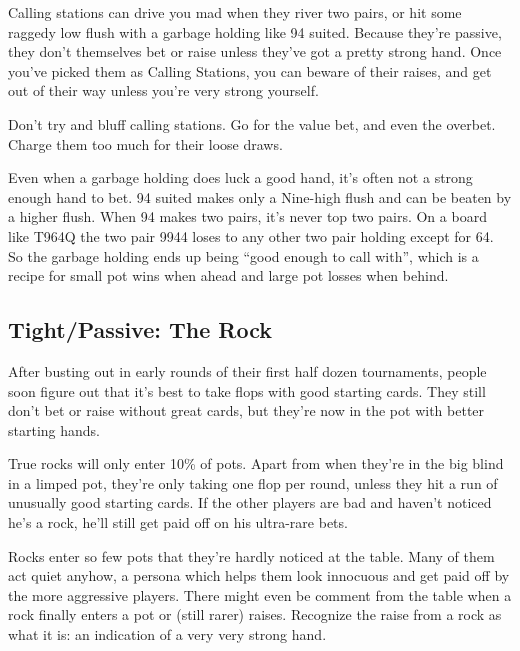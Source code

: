 Calling stations can drive you mad when they river two pairs, 
or hit some raggedy low flush with a garbage holding like 94 suited.
Because they're passive, they don't themselves bet or raise unless
they've got a pretty strong hand. Once you've picked them as
Calling Stations, you can beware of their raises, and get out of
their way unless you're very strong yourself.

Don't try and bluff calling stations. Go for the value bet,
and even the overbet. Charge them too much for their loose draws.

Even when a garbage holding does luck a good hand, it's often
not a strong enough hand to bet. 94 suited makes only a Nine-high
flush and can be beaten by a higher flush. When 94 makes two pairs,
it's never top two pairs. On a board like T964Q the two pair 9944
loses to any other two pair holding except for 64. So the garbage
holding ends up being ``good enough to call with'', which is a
recipe for small pot wins when ahead and large pot losses when
behind.

\subsection{Tight/Passive: The Rock}

After busting out in early rounds of their first half dozen
tournaments, people soon figure out that it's best to take flops
with good starting cards. They still don't bet or raise without
great cards, but they're now in the pot with better starting hands.

True rocks will only enter 10\% of pots. Apart from when they're
in the big blind in a limped pot, they're only taking one 
flop per round, unless they hit a run of unusually good starting
cards. If the other players are bad and haven't noticed
he's a rock, he'll still get paid off on his ultra-rare bets.


Rocks enter so few pots that they're hardly noticed
at the table. Many of them act quiet anyhow,
a persona which helps them look innocuous and get paid off by the
more aggressive players. There might even be comment from the table
when a rock finally enters a pot or (still rarer) raises. Recognize
the raise from a rock as what it is: an indication of a very very
strong hand.

